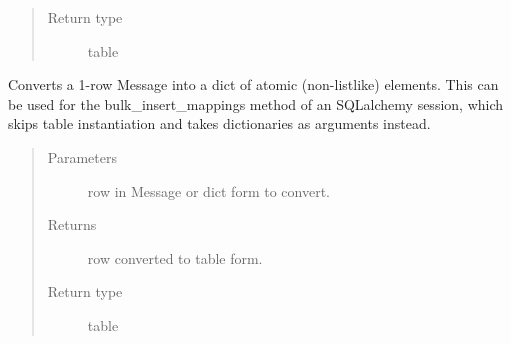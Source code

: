\documentclass[letterpaper,10pt,english]{sphinxmanual}
\begin{document}
\begin{fulllineitems}
\begin{fulllineitems}
\begin{quote}
\begin{description}
\item[{Return type}] \leavevmode
table

\end{description}\end{quote}

\end{fulllineitems}


\begin{fulllineitems}
\label{\detokenize{Fireworks:Fireworks.extensions.database.TablePipe.make_row_dict}}
Converts a 1-row Message into a dict of atomic (non-listlike) elements. This can be used for the bulk\_insert\_mappings method of
an SQLalchemy session, which skips table instantiation and takes dictionaries as arguments instead.
\begin{quote}\begin{description}
\item[{Parameters}] \leavevmode
{} \textendash{} row in Message or dict form to convert.

\item[{Returns}] \leavevmode
row converted to table form.

\item[{Return type}] \leavevmode
table

\end{description}\end{quote}

\end{fulllineitems}


\end{fulllineitems}

\end{document}
